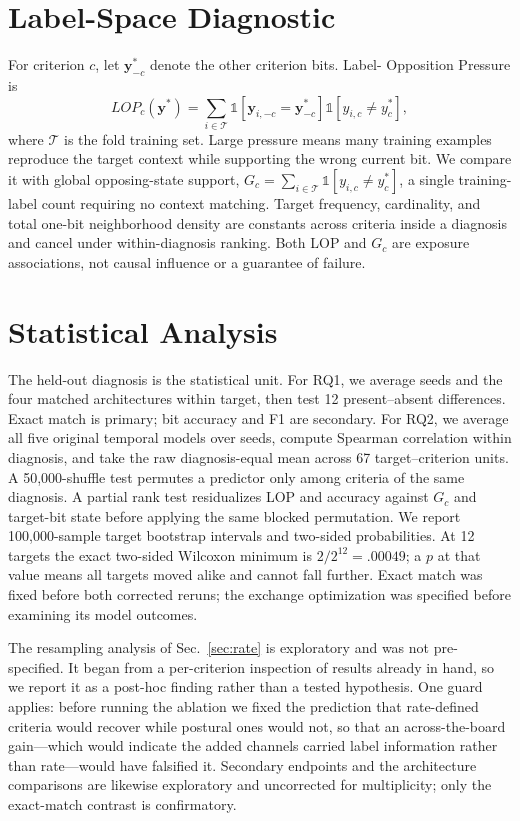 \documentclass[conference,a4paper]{IEEEtran}
\newcommand{\pressure}{LOP}
\begin{document}
\section{Label-Space Diagnostic}
For criterion $c$, let $\mathbf y^*_{-c}$ denote the other criterion bits. Label-
Opposition Pressure is
\begin{equation}
\pressure_c(\mathbf y^*)=\sum_{i\in\mathcal T}
\mathbb 1[\mathbf y_{i,-c}=\mathbf y^*_{-c}]
\mathbb 1[y_{i,c}\ne y_c^*],
\end{equation}
where $\mathcal T$ is the fold training set. Large pressure means many training
examples reproduce the target context while supporting the wrong current bit.
We compare it with global opposing-state support,
$G_c=\sum_{i\in\mathcal T}\mathbb 1[y_{i,c}\ne y_c^*]$, a single training-label
count requiring no context matching. Target frequency, cardinality, and total
one-bit neighborhood density are constants across criteria inside a diagnosis
and cancel under within-diagnosis ranking. Both LOP and $G_c$ are exposure
associations, not causal influence or a guarantee of failure.

\section{Statistical Analysis}
The held-out diagnosis is the statistical unit. For RQ1, we average seeds and the
four matched architectures within target, then test 12 present--absent differences.
Exact match is primary; bit accuracy and F1 are secondary. For RQ2, we average
all five original temporal models over seeds, compute Spearman correlation within
diagnosis, and take the raw diagnosis-equal mean across 67 target--criterion units.
A 50,000-shuffle test permutes a predictor only among criteria of the same
diagnosis. A partial rank test residualizes LOP and accuracy against $G_c$ and
target-bit state before applying the same blocked permutation. We report
100,000-sample target bootstrap intervals and two-sided probabilities. At 12 targets
the exact two-sided Wilcoxon minimum is $2/2^{12}=.00049$; a $p$ at that value
means all targets moved alike and cannot fall further. Exact
match was fixed before both corrected reruns; the exchange optimization was
specified before examining its model outcomes.

The resampling analysis of Sec.~\ref{sec:rate} is exploratory and was not
pre-specified. It began from a per-criterion inspection of results already in
hand, so we report it as a post-hoc finding rather than a tested hypothesis.
One guard applies: before running the ablation we fixed the prediction that
rate-defined criteria would recover while postural ones would not, so that an
across-the-board gain---which would indicate the added channels carried label
information rather than rate---would have falsified it. Secondary endpoints and
the architecture comparisons are likewise exploratory and uncorrected for
multiplicity; only the exact-match contrast is confirmatory.
\end{document}

